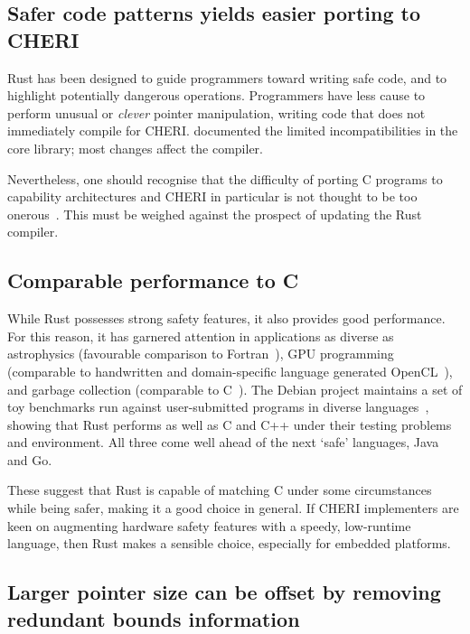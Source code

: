 \documentclass[dissertation.tex]{subfiles}
\begin{document}
\subsection{Safer code patterns yields easier porting to CHERI}
\label{sec:eval-cheri-port}

Rust has been designed to guide programmers toward writing safe code,
and to highlight potentially dangerous operations.
Programmers have less cause to perform unusual or \emph{clever} pointer
manipulation, writing code that does not immediately compile for CHERI.
 documented the limited incompatibilities in the
core library; most changes affect the compiler.

Nevertheless, one should recognise that the difficulty of porting C
programs to capability architectures and CHERI in particular is not
thought to be too onerous~\cite{capsicum-usability}.
This must be weighed against the prospect of updating the Rust compiler.


\subsection{Comparable performance to C}
\label{sec:eval-cheri-perf}

While Rust possesses strong safety features, it also provides good
performance.
For this reason, it has garnered attention in applications as diverse as
astrophysics (favourable comparison to Fortran~\cite{blanco-astro}), GPU
programming (comparable to handwritten and domain-specific language
generated OpenCL~\cite{holk-gpu}), and garbage collection (comparable to
C~\cite{lin-gc}).
The Debian project maintains a set of toy benchmarks run against
user-submitted programs in diverse
languages~\cite{debian-benchmarksgame}, showing that Rust performs as
well as C and C++ under their testing problems and environment.
All three come well ahead of the next `safe' languages, Java and Go.

These suggest that Rust is capable of matching C under some
circumstances while being safer, making it a good choice in general.
If CHERI implementers are keen on augmenting hardware safety features
with a speedy, low-runtime language, then Rust makes a sensible choice,
especially for embedded platforms.


\subsection{Larger pointer size can be offset by removing redundant bounds information}
\label{sec:eval-cheri-memfoot}
\end{document}

